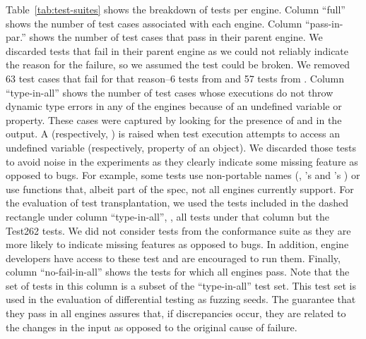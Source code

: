 \documentclass[sigconf,review, anonymous]{acmart}
\begin{document}
Table~\ref{tab:test-suites} shows the breakdown of tests per
engine. Column ``full'' shows the number of test cases associated with
each engine. Column ``pass-in-par.''  shows the number of test cases
that pass in their parent engine. We discarded tests that fail in
their parent engine as we could not reliably indicate the reason for
the failure, so we assumed the test could be broken. We removed 63
test cases that fail for that reason--6 tests from \jsc{} and 57 tests
from \smonkey. Column ``type-in-all'' shows the number of test cases
whose executions do not throw dynamic type errors in any of the
engines because of an undefined variable or property. These cases were
captured by looking for the presence of  and
 in the output. A 
(respectively, ) is raised when test execution
attempts to access an undefined variable (respectively, property of an
object). We discarded those tests to avoid noise in the experiments as
they clearly indicate some missing feature as opposed to bugs. For
example, some tests use non-portable names (\eg{}, \jsc{}'s
 and \smonkey{}'s )
or use functions that, albeit part of the spec, not all engines
currently support. For the evaluation of test transplantation, we used
the \totalTestFilesForTestTransplantation{} tests included in the
dashed rectangle under column ``type-in-all'', \ie{}, all tests under
that column but the Test262 tests. We did not consider tests from the
conformance suite as they are more likely to indicate missing features
as opposed to bugs. In addition, engine developers have access to
these test and are encouraged to run them. Finally, column
``no-fail-in-all'' shows the tests for which all engines pass. Note
that the set of tests in this column is a subset of the
``type-in-all'' test set. This test set is used in the evaluation of
differential testing as fuzzing seeds. The guarantee that they pass in
all engines assures that, if discrepancies occur, they are related to
the changes in the input as opposed to the original cause of failure.

\newcommand\marktopleft[1]{%
    \tikz[overlay,remember picture] 
        \node (marker-#1-a) at (0,2ex) {};%
}
\newcommand\markbottomright[1]{%
    \tikz[overlay,remember picture] 
        \node (marker-#1-b) at (0,0) {};%
    \tikz[overlay,remember picture,thick,dashed,inner sep=2pt]
        \node[draw,rectangle,fit=(marker-#1-a.center) (marker-#1-b.center)] {};%
}
\end{document}
